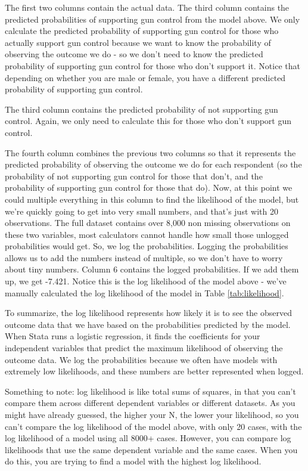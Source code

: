 \documentclass[12pt]{amsart}
\begin{document}
The first two columns contain the actual data. The third column contains the predicted probabilities of supporting gun control from the model above. We only calculate the predicted probability of supporting gun control for those who actually support gun control because we want to know the probability of observing the outcome we do - so we don't need to know the predicted probability of supporting gun control for those who don't support it. Notice that depending on whether you are male or female, you have a different predicted probability of supporting gun control. 

The third column contains the predicted probability of not supporting gun control. Again, we only need to calculate this for those who don't support gun control.

The fourth column combines the previous two columns so that it represents the predicted probability of observing the outcome we do for each respondent (so the probability of not supporting gun control for those that don't, and the probability of supporting gun control for those that do). Now, at this point we could multiple everything in this column to find the likelihood of the model, but we're quickly going to get into very small numbers, and that's just with 20 observations. The full dataset contains over 8,000 non missing observations on these two variables, most calculators cannot handle how small those unlogged probabilities would get. So, we log the probabilities. Logging the probabilities allows us to add the numbers instead of multiple, so we don't have to worry about tiny numbers. Column 6 contains the logged probabilities. If we add them up, we get -7.421. Notice this is the log likelihood of the model above - we've manually calculated the log likelihood of the model in Table \ref{tab:likelihood}. 

To summarize, the log likelihood represents how likely it is to see the observed outcome data that we have based on the probabilities predicted by the model. When Stata runs a logistic regression, it finds the coefficients for your independent variables that predict the maximum likelihood of observing the outcome data. We log the probabilities because we often have models with extremely low likelihoods, and these numbers are better represented when logged. 

Something to note: log likelihood is like total sums of squares, in that you can't compare them across different dependent variables or different datasets. As you might have already guessed, the higher your N, the lower your likelihood, so you can't compare the log likelihood of the model above, with only 20 cases, with the log likelihood of a model using all 8000+ cases. However, you can compare log likelihoods that use the same dependent variable and the same cases. When you do this, you are trying to find a model with the highest log likelihood. 
\end{document}
